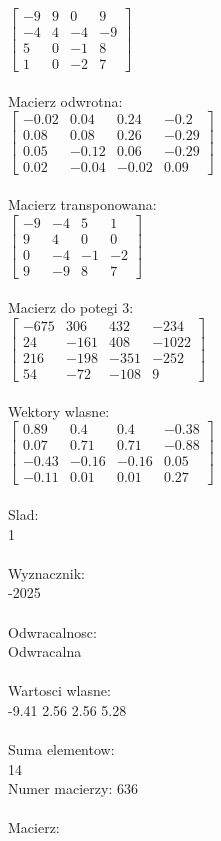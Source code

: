 \documentclass[a4paper,12pt]{article}
\begin{document}
$\begin{bmatrix} -9&9&0&9\\-4&4&-4&-9\\5&0&-1&8\\1&0&-2&7 \end{bmatrix}$
\\
\\
Macierz odwrotna:\\

$\begin{bmatrix} -0.02&0.04&0.24&-0.2\\0.08&0.08&0.26&-0.29\\0.05&-0.12&0.06&-0.29\\0.02&-0.04&-0.02&0.09 \end{bmatrix}$
\\
\\
Macierz transponowana:\\

$\begin{bmatrix} -9&-4&5&1\\9&4&0&0\\0&-4&-1&-2\\9&-9&8&7 \end{bmatrix}$
\\
\\
Macierz do potegi 3:\\

$\begin{bmatrix} -675&306&432&-234\\24&-161&408&-1022\\216&-198&-351&-252\\54&-72&-108&9 \end{bmatrix}$
\\
\\
Wektory wlasne:\\

$\begin{bmatrix} 0.89&0.4&0.4&-0.38\\0.07&0.71&0.71&-0.88\\-0.43&-0.16&-0.16&0.05\\-0.11&0.01&0.01&0.27 \end{bmatrix}$
\\
\\
Slad:\\
1
\\
\\
Wyznacznik:\\
-2025
\\
\\
Odwracalnosc:\\
Odwracalna
\\
\\
Wartosci wlasne:\\
-9.41 2.56 2.56 5.28
\\
\\
Suma elementow:\\
14
\\
\newpage
Numer macierzy:
636
\\
\\
Macierz:\\
\end{document}
